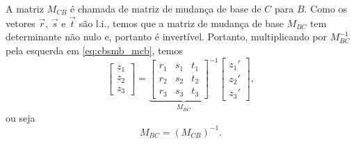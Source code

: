 A matriz $M_{CB}$ é chamada de matriz de mudança de base de $C$ para $B$. Como os vetores $\vec{r}$, $\vec{s}$ e $\vec{t}$ são l.i., temos que a matriz de mudança de base $M_{BC}$ tem determinante não nulo e, portanto é invertível. Portanto, multiplicando por $M_{BC}^{-1}$ pela esquerda em \eqref{eq:cbsmb_mcb}, temos
\begin{equation}
    \begin{bmatrix}
    z_1\\
    z_2\\
    z_3
  \end{bmatrix} =
  \underbrace{\begin{bmatrix}
    r_1 & s_1 & t_1\\
    r_2 & s_2 & t_2\\
    r_3 & s_3 & t_3
  \end{bmatrix}^{-1}}_{M_{BC}}
  \begin{bmatrix}
    z_1'\\
    z_2'\\
    z_3'
  \end{bmatrix},
\end{equation}
ou seja
\begin{equation}
  M_{BC} = (M_{CB})^{-1}. 
\end{equation}

